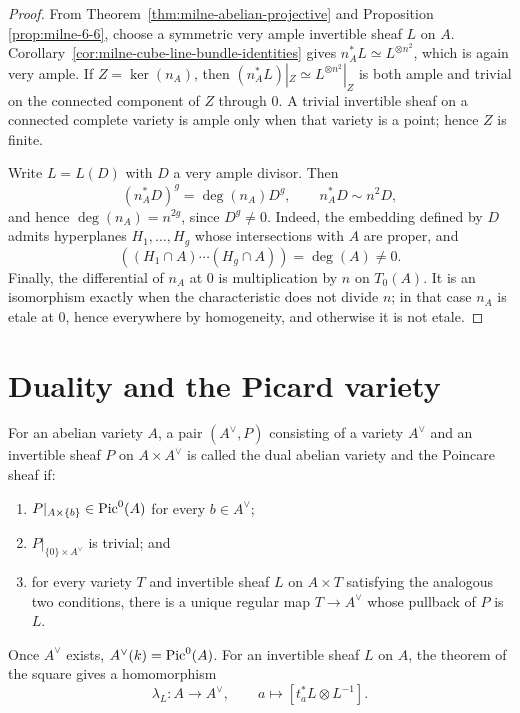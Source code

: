 \begin{proof}
From Theorem~\ref{thm:milne-abelian-projective} and Proposition
\ref{prop:milne-6-6}, choose a symmetric very ample invertible sheaf $L$ on
$A$.  Corollary~\ref{cor:milne-cube-line-bundle-identities} gives
$n_A^*L\simeq L^{\otimes n^2}$, which is again very ample.  If
$Z=\ker(n_A)$, then
$(n_A^*L)|_Z\simeq L^{\otimes n^2}|_Z$ is both ample and trivial on the
connected component of $Z$ through $0$.  A trivial invertible sheaf on a
connected complete variety is ample only when that variety is a point; hence
$Z$ is finite.

Write $L=L(D)$ with $D$ a very ample divisor.  Then
\[
 (n_A^*D)^g=\deg(n_A)D^g,\qquad n_A^*D\sim n^2D,
\]
and hence $\deg(n_A)=n^{2g}$, since $D^g\ne0$.  Indeed, the embedding defined
by $D$ admits hyperplanes $H_1,\ldots,H_g$ whose intersections with $A$ are
proper, and
\[
((H_1\cap A)\cdots(H_g\cap A))=\deg(A)\ne0.
\]
Finally, the differential of $n_A$ at $0$ is multiplication by $n$ on
$T_0(A)$.  It is an isomorphism exactly when the characteristic does not
divide $n$; in that case $n_A$ is etale at $0$, hence everywhere by
homogeneity, and otherwise it is not etale.
\end{proof}

\section{Duality and the Picard variety}

\begin{definition}
\label{def:milne-dual-abelian}

For an abelian variety $A$, a pair $(A^\vee,P)$ consisting of a variety
$A^\vee$ and an invertible sheaf $P$ on $A\times A^\vee$ is called the dual
abelian variety and the Poincare sheaf if:
\begin{enumerate}
\item $P|_{A\times\{b\}}\in\operatorname{Pic}^0(A)$ for every $b\in A^\vee$;
\item $P|_{\{0\}\times A^\vee}$ is trivial; and
\item for every variety $T$ and invertible sheaf $L$ on $A\times T$ satisfying
the analogous two conditions, there is a unique regular map $T\to A^\vee$
whose pullback of $P$ is $L$.
\end{enumerate}
Once $A^\vee$ exists, $A^\vee(k)=\operatorname{Pic}^0(A)$.  For an invertible sheaf $L$
on $A$, the theorem of the square gives a homomorphism
\[
 \lambda_L:A\longrightarrow A^\vee,
 \qquad a\longmapsto[t_a^*L\otimes L^{-1}].
\]
\end{definition}

